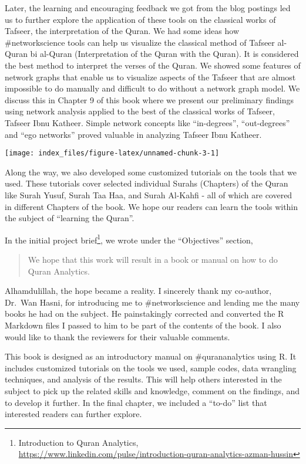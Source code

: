 \documentclass[
]{article}
\begin{document}
Later, the learning and encouraging feedback we got from the blog postings led us to further explore the application of these tools on the classical works of Tafseer, the interpretation of the Quran. We had some ideas how \#networkscience tools can help us visualize the classical method of Tafseer al-Quran bi al-Quran (Interpretation of the Quran with the Quran). It is considered the best method to interpret the verses of the Quran. We showed some features of network graphs that enable us to visualize aspects of the Tafseer that are almost impossible to do manually and difficult to do without a network graph model. We discuss this in Chapter 9 of this book where we present our preliminary findings using network analysis applied to the best of the classical works of Tafseer, Tafseer Ibnu Katheer. Simple network concepts like ``in-degrees'', ``out-degrees'' and ``ego networks'' proved valuable in analyzing Tafseer Ibnu Katheer.

\begin{center}\texttt{[image: index\_files/figure-latex/unnamed-chunk-3-1]} \end{center}

Along the way, we also developed some customized tutorials on the tools that we used. These tutorials cover selected individual Surahs (Chapters) of the Quran like Surah Yusuf, Surah Taa Haa, and Surah Al-Kahfi - all of which are covered in different Chapters of the book. We hope our readers can learn the tools within the subject of ``learning the Quran''.

In the initial project brief\footnote{Introduction to Quran Analytics, \url{https://www.linkedin.com/pulse/introduction-quran-analytics-azman-hussin}}, we wrote under the ``Objectives'' section,

\begin{quote}
We hope that this work will result in a book or manual on how to do Quran Analytics.
\end{quote}

Alhamdulillah, the hope became a reality. I sincerely thank my co-author, Dr.~Wan Hasni, for introducing me to \#networkscience and lending me the many books he had on the subject. He painstakingly corrected and converted the R Markdown files I passed to him to be part of the contents of the book. I also would like to thank the reviewers for their valuable comments.

This book is designed as an introductory manual on \#qurananalytics using R. It includes customized tutorials on the tools we used, sample codes, data wrangling techniques, and analysis of the results. This will help others interested in the subject to pick up the related skills and knowledge, comment on the findings, and to develop it further. In the final chapter, we included a ``to-do'' list that interested readers can further explore.
\end{document}
